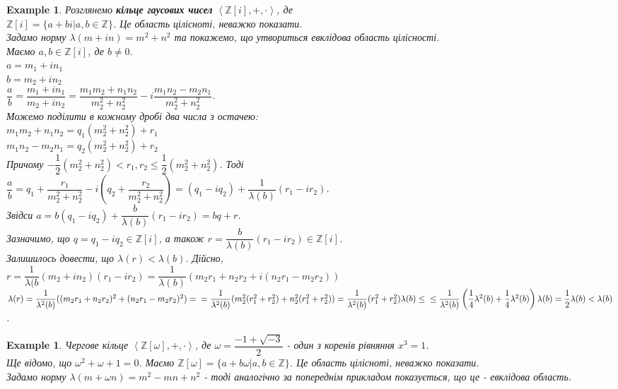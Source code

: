 \documentclass[a4paper, 10pt]{article}
\theoremstyle{theoremdd}
\theoremstyle{theoremdd}
\theoremstyle{theoremdd}
\theoremstyle{theoremdd}
\newtheorem{example}[theorem]{Example}
\theoremstyle{theoremdd}
\theoremstyle{theoremdd}
\theoremstyle{theoremdd}
\theoremstyle{theoremdd}
\begin{document}
\begin{example}
Розглянемо \textbf{кільце гаусових чисел} $\left< \mathbb{Z}[i], +, \cdot \right>$, де\\
$\mathbb{Z}[i] = \{ a+bi | a,b \in \mathbb{Z} \}$. Це область цілісноті, неважко показати.\\
Задамо норму $\lambda(m+in) = m^2 + n^2$ та покажемо, що утвориться евклідова область цілісності.\\
Маємо $a,b \in \mathbb{Z}[i]$, де $b \neq 0$.\\
$a = m_1 + in_1$\\
$b = m_2 + in_2$\\
$\dfrac{a}{b} = \dfrac{m_1+in_1}{m_2+in_2} = \dfrac{m_1m_2+n_1n_2}{m_2^2+n_2^2} - i \dfrac{m_1n_2 - m_2n_1}{m_2^2+n_2^2}$.\\
Можемо поділити в кожному дробі два числа з остачею:\\
$m_1m_2 + n_1n_2 = q_1(m_2^2+n_2^2) + r_1$\\
$m_1n_2 - m_2n_1 = q_2(m_2^2+n_2^2) + r_2$\\
Причому $-\dfrac{1}{2} (m_2^2+n_2^2) < r_1,r_2 \leq \dfrac{1}{2}(m_2^2+n_2^2)$. Тоді\\
$\dfrac{a}{b} = q_1 + \dfrac{r_1}{m_2^2 + n_2^2} - i \left( q_2 + \dfrac{r_2}{m_2^2+n_2^2} \right) = (q_1-iq_2) + \dfrac{1}{\lambda(b)}(r_1-ir_2)$.\\
Звідси $a = b(q_1-iq_2) + \dfrac{b}{\lambda(b)}(r_1-ir_2) = bq + r$.\\
Зазначимо, що $q = q_1-iq_2 \in \mathbb{Z}[i]$, а також $r = \dfrac{b}{\lambda(b)}(r_1-ir_2) \in \mathbb{Z}[i]$.\\
Залишилось довести, що $\lambda(r) < \lambda(b)$. Дійсно,\\
$r = \dfrac{1}{\lambda(b}(m_2+in_2)(r_1-ir_2) = \dfrac{1}{\lambda(b)}(m_2r_1+n_2r_2 + i(n_2r_1 - m_2r_2))$\\
$\lambda(r) = \dfrac{1}{\lambda^2(b)} ((m_2r_1+n_2r_2)^2 + (n_2r_1-m_2r_2)^2) = \\
= \dfrac{1}{\lambda^2(b)} (m_2^2(r_1^2+r_2^2) + n_2^2(r_1^2+r_2^2)) = \dfrac{1}{\lambda^2(b)} (r_1^2+r_2^2) \lambda(b) \leq \\ \leq \dfrac{1}{\lambda^2(b)} \left( \dfrac{1}{4}\lambda^2(b) + \dfrac{1}{4} \lambda^2(b) \right) \lambda(b) = \dfrac{1}{2} \lambda(b) < \lambda(b)$.
\end{example}

\begin{example}
Чергове кільце $\left< \mathbb{Z}[\omega], +, \cdot \right>$, де $\omega = \dfrac{-1+ \sqrt{-3}}{2}$ - один з коренів рівняння $x^3=1$.\\
Ще відомо, що $\omega^2 + \omega + 1 = 0$. Маємо $\mathbb{Z}[\omega] = \{ a+b \omega | a,b \in \mathbb{Z} \}$. Це область цілісноті, неважко показати.\\
Задамо норму $\lambda(m+ \omega n) = m^2 - mn + n^2$ - тоді аналогічно за попереднім прикладом показується, що це - евклідова область.
\end{example}
\end{document}
